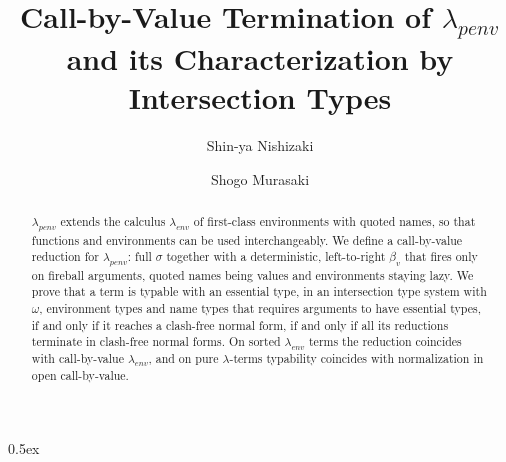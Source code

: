 \documentclass[11pt,a4paper]{article}
\begin{document}
\title{Call-by-Value Termination of $\lambda_{penv}$\\and its Characterization by Intersection Types}
\author{Shin-ya Nishizaki \and Shogo Murasaki}
\maketitle

\begin{abstract}
$\lambda_{penv}$ extends the calculus $\lambda_{env}$ of first-class environments with
quoted names, so that functions and environments can be used interchangeably.  We define
a call-by-value reduction for $\lambda_{penv}$: full $\sigma$ together with a deterministic,
left-to-right $\beta_v$ that fires only on fireball arguments, quoted names being values
and environments staying lazy.  We prove that a term is typable with an essential type,
in an intersection type system with $\omega$, environment types and name types that
requires arguments to have essential types, if and only if it reaches a clash-free normal
form, if and only if all its reductions terminate in clash-free normal forms.  On sorted
$\lambda_{env}$ terms the reduction coincides with call-by-value $\lambda_{env}$, and on pure
$\lambda$-terms typability coincides with normalization in open call-by-value.
\end{abstract}

\tableofcontents

\parindent 0pt\parskip 0.5ex


\end{document}
